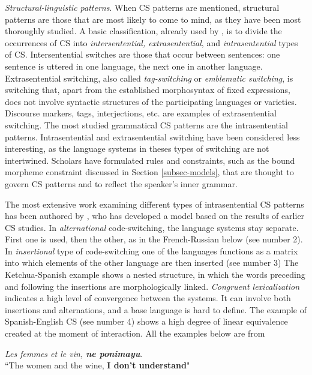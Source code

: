 \documentclass[output=paper,
modfonts
]{langscibook}
\begin{document}
\textit{Structural-linguistic patterns}. When CS patterns are mentioned, structural patterns are those that are most likely to come to mind, as they have been most thoroughly studied. A basic classification, already used by \cite{poplack1980sometimes}, is to divide the occurrences of CS into \textit{intersentential, extrasentential}, and \textit{intrasentential} types of CS. Intersentential switches are those that occur between sentences: one sentence is uttered in one language, the next one in another language. Extrasentential switching, also called \textit{tag-switching} or \textit{emblematic switching}, is switching that, apart from the established morphosyntax of fixed expressions, does not involve syntactic structures of the participating languages or varieties. Discourse markers, tags, interjections, etc. are examples of extrasentential switching. The most studied grammatical CS patterns are the intrasentential patterns. Intrasentential and extrasentential switching have been considered less interesting, as the language systems in theses types of switching are not intertwined. Scholars have formulated rules and constraints, such as the bound morpheme constraint discussed in Section \ref{subsec-models}, that are thought to govern CS patterns and to reflect the speaker's inner grammar. 


The most extensive work examining different types of intrasentential CS patterns has been authored by \cite{muysken2000,muysken2013language}, who has developed a model based on the results of earlier CS studies. In \textit{alternational} code-switching, the language systems stay separate. First one is used, then the other, as in the French-Russian below (see number 2). In \textit{insertional} type of code-switching one of the languages functions as a matrix into which elements of the other language are then inserted (see number 3) The Ketchua-Spanish example shows a nested structure, in which the words preceding and following the insertions are morphologically linked. \textit{Congruent lexicalization} indicates a high level of convergence between the systems. It can involve both insertions and alternations, and a base language is hard to define. The example of Spanish-English CS (see number 4) shows a high degree of linear equivalence created at the moment of interaction.  All the examples below are from \cite{muysken2000}

\begin{exe}
\label{alternation}
\begin{ex}
\textit {Les femmes et le vin,  \textbf{ne ponimayu}}.\\
“The women and the wine, \textbf{I don't understand}"
\end{ex}
\end{exe}
\end{document}
